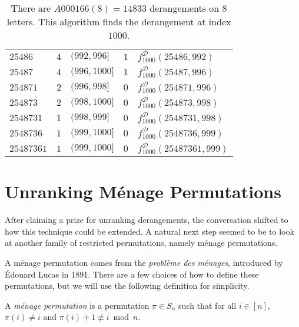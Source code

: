 \begin{table}
\begin{tabular}{|l|r|l|c|l|}
  $25486   $ & $4$    & $(992, 996]$      & $1$ & $f^{\mathcal{D}}_{1000}(25486, 992)$    \\
  $25487   $ & $4$    & $(996, 1000]$     & $1$ & $f^{\mathcal{D}}_{1000}(25487, 996)$    \\
  \hline
  $254871   $ & $2$   & $(996, 998]$      & $0$ & $f^{\mathcal{D}}_{1000}(254871, 996)$   \\
  $254873   $ & $2$   & $(998, 1000]$     & $0$ & $f^{\mathcal{D}}_{1000}(254873, 998)$   \\
  \hline
  $2548731  $ & $1$   & $(998, 999]$      & $0$ & $f^{\mathcal{D}}_{1000}(2548731, 998)$  \\
  $2548736  $ & $1$   & $(999, 1000]$     & $0$ & $f^{\mathcal{D}}_{1000}(2548736, 999)$  \\
  \hline
  $25487361 $ & $1$   & $(999, 1000]$     & $0$ & $f^{\mathcal{D}}_{1000}(25487361, 999)$ \\
  \hline
\end{tabular}
\caption[Steps for computing the $1000$th derangement in $S_8$]{
  There are $A000166(8) = 14833$ derangements on $8$ letters.
  This algorithm finds the derangement at index $1000$.
}
\label{table:unrankDerangement}
\end{table}

\section{Unranking M\'enage Permutations}
\label{sec:unrankingMenage}
After claiming a prize for unranking derangements, the conversation shifted to
how this technique could be extended. A natural next step seemed to be to look
at another family of restricted permutations, namely m\'enage permutations.

A m\'enage permutation comes from the \textit{problème des ménages},
introduced by \'Edouard Lucas in 1891.
There are a few choices of how to define these permutations, but we will
use the following definition for simplicity.
\begin{definition}
  A \textit{m\'enage permutation} is a permutation $\pi \in S_n$ such that for
  all $i \in [n]$,
  $\pi(i) \neq i$ and
  $\pi(i) + 1 \not\equiv i \bmod n$.
\end{definition}

